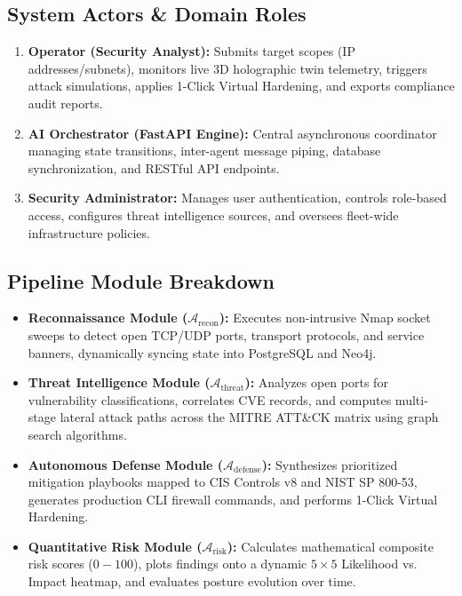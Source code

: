 \documentclass[conference]{IEEEtran}
\begin{document}
\subsection{System Actors \& Domain Roles}
\begin{enumerate}
    \item \textbf{Operator (Security Analyst):} Submits target scopes (IP addresses/subnets), monitors live 3D holographic twin telemetry, triggers attack simulations, applies 1-Click Virtual Hardening, and exports compliance audit reports.
    \item \textbf{AI Orchestrator (FastAPI Engine):} Central asynchronous coordinator managing state transitions, inter-agent message piping, database synchronization, and RESTful API endpoints.
    \item \textbf{Security Administrator:} Manages user authentication, controls role-based access, configures threat intelligence sources, and oversees fleet-wide infrastructure policies.
\end{enumerate}

\subsection{Pipeline Module Breakdown}
\begin{itemize}
    \item \textbf{Reconnaissance Module ($\mathcal{A}_{\text{recon}}$):} Executes non-intrusive Nmap socket sweeps to detect open TCP/UDP ports, transport protocols, and service banners, dynamically syncing state into PostgreSQL and Neo4j.
    \item \textbf{Threat Intelligence Module ($\mathcal{A}_{\text{threat}}$):} Analyzes open ports for vulnerability classifications, correlates CVE records, and computes multi-stage lateral attack paths across the MITRE ATT\&CK matrix using graph search algorithms.
    \item \textbf{Autonomous Defense Module ($\mathcal{A}_{\text{defense}}$):} Synthesizes prioritized mitigation playbooks mapped to CIS Controls v8 and NIST SP 800-53, generates production CLI firewall commands, and performs 1-Click Virtual Hardening.
    \item \textbf{Quantitative Risk Module ($\mathcal{A}_{\text{risk}}$):} Calculates mathematical composite risk scores ($0 - 100$), plots findings onto a dynamic $5 \times 5$ Likelihood vs. Impact heatmap, and evaluates posture evolution over time.
\end{itemize}
\end{document}
